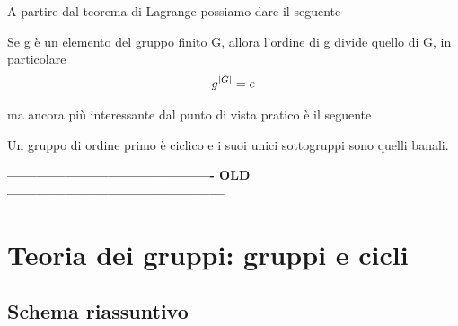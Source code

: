 \begin{flushleft}
A partire dal teorema di Lagrange possiamo dare il seguente
\begin{corollario}
Se g è un elemento del gruppo finito G, allora l'ordine di g divide quello di G, in particolare
\[g^{\abs{G}} = e\]
\end{corollario}
ma ancora più interessante dal punto di vista pratico è il seguente
\begin{corollario}
Un gruppo di ordine primo è ciclico e i suoi unici sottogruppi sono quelli banali.
\end{corollario}







































































\textbf{-------------------------------------------  OLD  ---------------------------------------------}
\section{Teoria dei gruppi: gruppi e cicli}
\subsection{Schema riassuntivo}

\end{flushleft}
